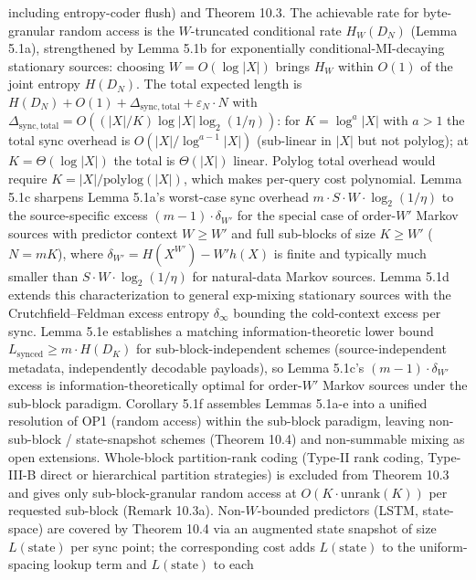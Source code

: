 \documentclass[
]{article}
\begin{document}
\begin{itemize}
  including entropy-coder flush) and Theorem 10.3. The achievable
  rate for byte-granular random access is the $W$-truncated
  conditional rate $H_W(D_N)$ (Lemma 5.1a), strengthened by
  Lemma 5.1b for exponentially conditional-MI-decaying stationary
  sources: choosing $W = O(\log |X|)$ brings $H_W$ within $O(1)$ of
  the joint entropy $H(D_N)$. The total expected length is
  $H(D_N) + O(1) + \Delta_{\mathrm{sync,total}} + \varepsilon_N \cdot N$
  with $\Delta_{\mathrm{sync,total}} = O((|X|/K) \log |X| \log_2(1/\eta))$:
  for $K = \log^a |X|$ with $a > 1$ the total sync overhead is
  $O(|X|/\log^{a-1} |X|)$ (sub-linear in $|X|$ but not polylog);
  at $K = \Theta(\log |X|)$ the total is $\Theta(|X|)$ linear.
  Polylog total overhead would require $K = |X|/\mathrm{polylog}(|X|)$,
  which makes per-query cost polynomial.
  Lemma 5.1c sharpens Lemma 5.1a's worst-case sync overhead
  $m \cdot S \cdot W \cdot \log_2(1/\eta)$ to the source-specific
  excess $(m - 1) \cdot \delta_{W'}$ for the special case of order-$W'$
  Markov sources with predictor context $W \geq W'$ and full sub-blocks
  of size $K \geq W'$ ($N = mK$), where
  $\delta_{W'} = H(X^{W'}) - W' h(X)$ is finite and typically much
  smaller than $S \cdot W \cdot \log_2(1/\eta)$ for natural-data
  Markov sources. Lemma 5.1d extends this characterization to general
  exp-mixing stationary sources with the Crutchfield--Feldman excess
  entropy $\delta_\infty$ bounding the cold-context excess per sync.
  Lemma 5.1e establishes a matching information-theoretic lower bound
  $L_{\mathrm{synced}} \geq m \cdot H(D_K)$ for sub-block-independent
  schemes (source-independent metadata, independently decodable
  payloads), so Lemma 5.1c's $(m-1) \cdot \delta_{W'}$ excess is
  information-theoretically optimal for order-$W'$ Markov sources
  under the sub-block paradigm. Corollary 5.1f assembles Lemmas
  5.1a-e into a unified resolution of OP1 (random access) within the
  sub-block paradigm, leaving non-sub-block / state-snapshot schemes
  (Theorem 10.4) and non-summable mixing as open extensions.
  Whole-block partition-rank coding (Type-II rank coding,
  Type-III-B direct or hierarchical partition strategies) is
  excluded from Theorem 10.3 and gives only sub-block-granular
  random access at $O(K \cdot \mathrm{unrank}(K))$ per requested
  sub-block (Remark 10.3a). Non-$W$-bounded
  predictors (LSTM, state-space) are covered by Theorem 10.4 via an
  augmented state snapshot of size $L(\text{state})$ per sync
  point; the corresponding cost adds $L(\text{state})$ to the
  uniform-spacing lookup term and $L(\text{state})$ to each

\end{itemize}
\end{document}
